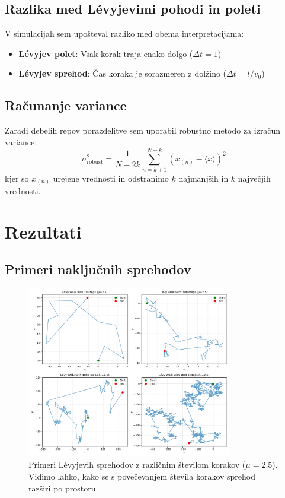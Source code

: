 \documentclass{article}
\begin{document}
\subsection{Razlika med Lévyjevimi pohodi in poleti}
V simulacijah sem upošteval razliko med obema interpretacijama:
\begin{itemize}
\item \textbf{Lévyjev polet}: Vsak korak traja enako dolgo ($\Delta t = 1$)
\item \textbf{Lévyjev sprehod}: Čas koraka je sorazmeren z dolžino ($\Delta t = l/v_0$)
\end{itemize}

\subsection{Računanje variance}
Zaradi debelih repov porazdelitve sem uporabil robustno metodo za izračun variance:
\begin{equation}
\sigma^2_{\text{robust}} = \frac{1}{N-2k} \sum_{n=k+1}^{N-k} (x_{(n)} - \langle x \rangle)^2
\end{equation}
kjer so $x_{(n)}$ urejene vrednosti in odstranimo $k$ najmanjših in $k$ največjih vrednosti.

\section{Rezultati}

\subsection{Primeri naključnih sprehodov}

\begin{figure}[ht]
\centering
\includegraphics[width=0.8\textwidth]{levy_walk.pdf}
\caption{Primeri Lévyjevih sprehodov z različnim številom korakov ($\mu = 2.5$). Vidimo lahko, kako se s povečevanjem števila korakov sprehod razširi po prostoru.}
\label{fig:walks}
\end{figure}
\end{document}
